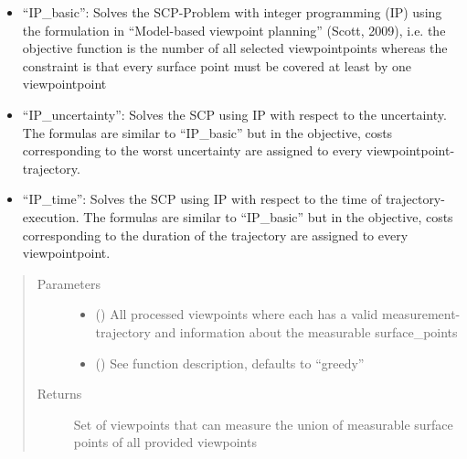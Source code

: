 \documentclass[letterpaper,10pt,english]{sphinxmanual}
\begin{document}
\begin{fulllineitems}
\begin{fulllineitems}
\begin{itemize}
\item {} 
“IP\_basic”: Solves the SCP-Problem with integer programming (IP) using the formulation in
“Model-based viewpoint planning” (Scott, 2009), i.e. the objective function is the number of all
selected viewpointpoints whereas the constraint is that every surface point must be covered at least by one viewpointpoint

\item {} 
“IP\_uncertainty”: Solves the SCP using IP with respect to the uncertainty. The formulas are similar to “IP\_basic”
but in the objective, costs corresponding to the worst uncertainty are assigned to every viewpointpoint-trajectory.

\item {} 
“IP\_time”: Solves the SCP using IP with respect to the time of trajectory-execution. The formulas are similar to “IP\_basic”
but in the objective, costs corresponding to the duration of the trajectory are assigned to every viewpointpoint.

\end{itemize}
\begin{quote}\begin{description}
\item[{Parameters}] \leavevmode\begin{itemize}
\item {} 
 (\sphinxstyleliteralemphasis{{[}}{\hyperref[\detokenize{module_view:agiprobot_measurement.viewpoint.ViewPoint}]{\sphinxcrossref{\sphinxstyleliteralemphasis{ViewPoint}}}}\sphinxstyleliteralemphasis{{]} or }\sphinxstyleliteralemphasis{{[}}{\hyperref[\detokenize{module_view:agiprobot_measurement.viewpoint.ViewPoint}]{\sphinxcrossref{\sphinxstyleliteralemphasis{ViewPoint}}}}\sphinxstyleliteralemphasis{{]}}) \textendash{} All processed viewpoints where each has a valid measurement-trajectory and information about the measurable surface\_points

\item {} 
 (\sphinxstyleliteralemphasis{, }) \textendash{} See function description, defaults to “greedy”

\end{itemize}

\item[{Returns}] \leavevmode
Set of viewpoints that can measure the union of measurable surface points of all provided viewpoints


\end{description}
\end{quote}
\end{fulllineitems}
\end{fulllineitems}
\end{document}
